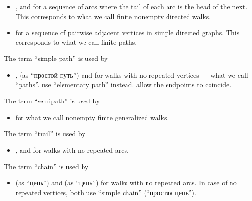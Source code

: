\begin{remark}
\begin{thmenum}
\begin{itemize}
      \item {},  and  for a sequence of arcs where the tail of each arc is the head of the next. This corresponds to what we call finite nonempty directed walks.

      \item {} for a sequence of pairwise adjacent vertices in simple directed graphs. This corresponds to what we call finite paths.
    \end{itemize}

     The term \enquote{simple path} is used by
    \begin{itemize}
      \item {},  (as \enquote{простой путь}) and  for walks with no repeated vertices --- what we call \enquote{paths}.  use \enquote{elementary path} instead.  allow the endpoints to coincide.
    \end{itemize}

     The term \enquote{semipath} is used by
    \begin{itemize}
      \item {} for what we call nonempty finite generalized walks.
    \end{itemize}

     The term \enquote{trail} is used by
    \begin{itemize}
      \item {},  and  for walks with no repeated arcs.
    \end{itemize}

     The term \enquote{chain} is used by
    \begin{itemize}
      \item {} (as \enquote{цепь}) and  (as \enquote{цепь}) for walks with no repeated arcs. In case of no repeated vertices, both use \enquote{simple chain} (\enquote{простая цепь}).


\end{itemize}
\end{thmenum}
\end{remark}
